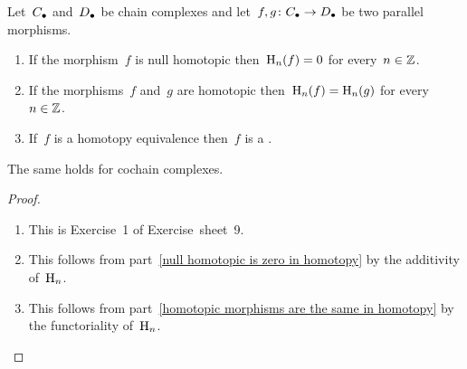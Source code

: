\begin{lemma}
  Let~$C_\bullet$ and~$D_\bullet$ be chain complexes and let~$f, g \colon C_\bullet \to D_\bullet$ be two parallel morphisms.
  \begin{enumerate}
    \item
      \label{null homotopic is zero in homotopy}
      If the morphism~$f$ is null homotopic then~$\operatorname{H}_n(f) = 0$ for every~$n \in \mathbb{Z}$.
    \item
      \label{homotopic morphisms are the same in homotopy}
      If the morphisms~$f$ and~$g$ are homotopic then~$\operatorname{H}_n(f) = \operatorname{H}_n(g)$ for every~$n \in \mathbb{Z}$.
    \item
      If~$f$ is a homotopy equivalence then~$f$ is a {\qim}.
  \end{enumerate}
  The same holds for cochain complexes.
\end{lemma}


\begin{proof}
  \leavevmode
  \begin{enumerate}
    \item
      This is Exercise~1 of Exercise~sheet~9.
    \item
      This follows from part~\ref*{null homotopic is zero in homotopy} by the additivity of~$\operatorname{H}_n$.
    \item
      This follows from part~\ref*{homotopic morphisms are the same in homotopy} by the functoriality of~$\operatorname{H}_n$.
    \qedhere
  \end{enumerate}
\end{proof}


